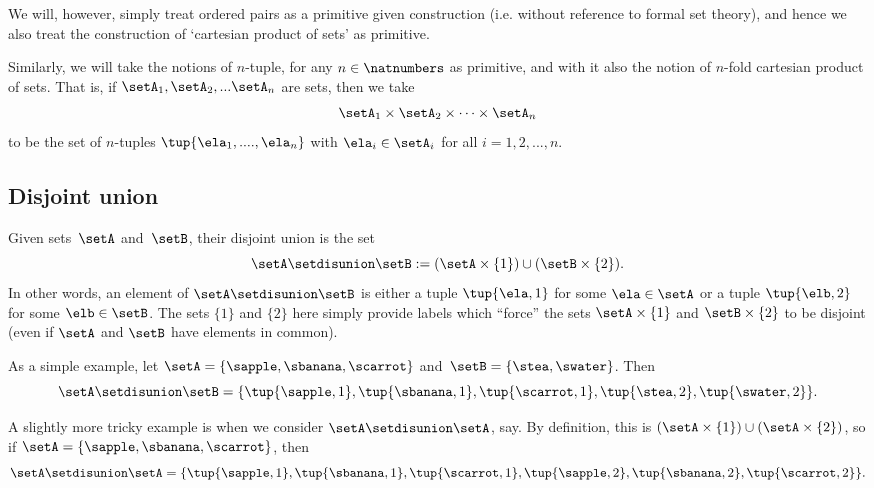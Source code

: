 We will, however, simply treat ordered pairs as a primitive given construction (i.e. without reference to formal set theory), and hence we also treat the construction of `cartesian product of sets' as primitive. 

Similarly, we will take the notions of $n$-tuple, for any $n \in \natnumbers$ as primitive, and with it also the notion of $n$-fold cartesian product of sets. That is, if $\setA_1, \setA_2, ... \setA_n$ are sets, then we take 
\begin{equation}
\setA_1 \times \setA_2 \times \dots \times \setA_n
\end{equation}
to be the set of $n$-tuples $\tup{\ela_1, ...., \ela_n}$ with $\ela_i \in \setA_i$ for all $i = 1,2,...,n$. 

\subsection{Disjoint union}
\label{sec:disjoint-union}

Given sets~$\setA$ and~$\setB$, their disjoint union is the set
\begin{equation*}
    \setA \setdisunion \setB := (\setA \times \{ 1 \}) \cup (\setB \times \{2\}).
\end{equation*}
In other words, an element of  $\setA \setdisunion \setB$ is either a tuple $\tup{\ela, 1}$ for some  $\ela \in \setA$ or a tuple $\tup{\elb, 2}$ for some $\elb \in \setB$. The sets $\{ 1 \}$ and $\{2\}$ here simply provide labels which ``force'' the sets $\setA \times \{ 1 \}$ and $\setB \times \{2\}$ to be disjoint (even if $\setA$ and $\setB$ have elements in common). 

As a simple example, let $\setA = \{ \sapple, \sbanana, \scarrot\}$ and~$\setB = \{ \stea, \swater \}$. Then
\begin{equation*}
    \setA \setdisunion \setB = \{ \tup{\sapple, 1}, \tup{\sbanana, 1}, \tup{\scarrot, 1}, \tup{\stea, 2},  \tup{\swater, 2}\}.
\end{equation*}

A slightly more tricky example is when we consider $\setA \setdisunion \setA$, say. By definition, this is $(\setA \times \{ 1 \}) \cup (\setA \times \{2\})$, so if $\setA = \{ \sapple, \sbanana, \scarrot\}$, then 
\begin{equation*}
\setA \setdisunion \setA = \{ \tup{\sapple, 1}, \tup{\sbanana, 1}, \tup{\scarrot, 1}, \tup{\sapple, 2}, \tup{\sbanana, 2}, \tup{\scarrot, 2} \}.
\end{equation*}


